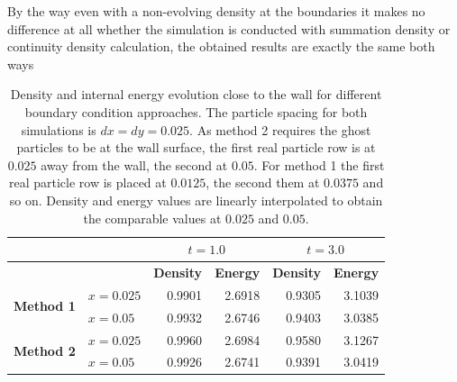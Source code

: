 \documentclass[11pt,a4paper,twoside]{report}
\begin{document}
By the way even with a non-evolving density at the boundaries it makes no difference at all whether the simulation is conducted with summation density or continuity density calculation, the obtained results are exactly the same both ways


\begin{table}[h] %
\label{tab:2DSPH_LinearWall_Poiseuille_WallErrorsRho_e}
\centering
\begin{tabular}[c]{||c||l||r|r||r|r||} %
\hline
&&\multicolumn{2}{|c|}{\textbf{$t=1.0$}}& \multicolumn{2}{|c|}{\textbf{$t=3.0$}}\\
\hline
 &&{\bf Density} & {\bf Energy} & {\bf Density}& {\bf Energy}\\
\hline
\hline
\multirow{2}{*}{{\bf Method 1}} &$x=0.025$&0.9901 & 2.6918 & 0.9305& 3.1039 \\
\hline
&$x=0.05$&0.9932 &2.6746 &0.9403 & 3.0385\\
\hline
\multirow{2}{*}{{\bf Method 2}}&$x=0.025$&0.9960 & 2.6984& 0.9580 & 3.1267 \\
\hline
&$x=0.05$&0.9926 & 2.6741 & 0.9391&3.0419 \\
\hline
\hline
\end{tabular}
\caption[]{Density and internal energy evolution close to the wall for different boundary condition approaches. The particle spacing for both simulations is $dx=dy=0.025$. As method 2 requires the ghost particles to be at the wall surface, the first real particle row is at $0.025$ away from the wall, the second at $0.05$. For method 1 the first real particle row is placed at $0.0125$, the second them at $0.0375$ and so on. Density and energy values are linearly interpolated to obtain the comparable values at $0.025$ and $0.05$.}
\end{table}
\end{document}
